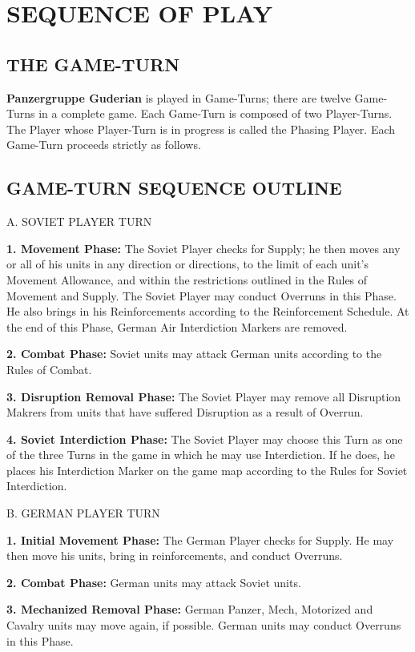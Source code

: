 \section{SEQUENCE OF PLAY}

\subsection{THE GAME-TURN}

\textbf{Panzergruppe Guderian} is played in Game-Turns; there are twelve Game-Turns in a complete game. Each Game-Turn is composed of two Player-Turns. The Player whose Player-Turn is in progress is called the Phasing Player. Each Game-Turn proceeds strictly as follows.

\subsection{GAME-TURN SEQUENCE OUTLINE}

A. SOVIET PLAYER TURN

\textbf{1. Movement Phase:} The Soviet Player checks for Supply; he then moves any or all of his units in any direction or directions, to the limit of each unit's Movement Allowance, and within the restrictions outlined in the Rules of Movement and Supply. The Soviet Player may conduct Overruns in this Phase. He also brings in his Reinforcements according to the Reinforcement Schedule. At the end of this Phase, German Air Interdiction Markers are removed.

\textbf{2. Combat Phase:} Soviet units may attack German units according to the Rules of Combat.

\textbf{3. Disruption Removal Phase:} The Soviet Player may remove all Disruption Makrers from units that have suffered Disruption as a result of Overrun.

\textbf{4. Soviet Interdiction Phase:} The Soviet Player may choose this Turn as one of the three Turns in the game in which he may use Interdiction. If he does, he places his Interdiction Marker on the game map according to the Rules for Soviet Interdiction.

B. GERMAN PLAYER TURN

\textbf{1. Initial Movement Phase:} The German Player checks for Supply. He may then move his units, bring in reinforcements, and conduct Overruns.

\textbf{2. Combat Phase:} German units may attack Soviet units.

\textbf{3. Mechanized Removal Phase:} German Panzer, Mech, Motorized and Cavalry units may move again, if possible. German units may conduct Overruns in this Phase.

